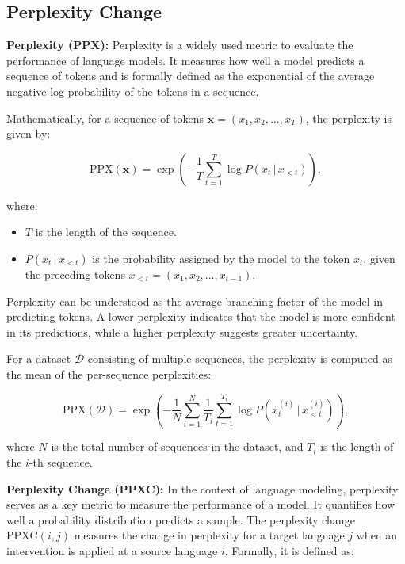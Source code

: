 \subsection{Perplexity Change}

\textbf{Perplexity (PPX):} Perplexity is a widely used metric to evaluate the performance of language models. It measures how well a model predicts a sequence of tokens and is formally defined as the exponential of the average negative log-probability of the tokens in a sequence. 

Mathematically, for a sequence of tokens $\mathbf{x} = (x_1, x_2, \dots, x_T)$, the perplexity is given by:

\begin{equation}
	\text{PPX}(\mathbf{x}) = \exp\left(-\frac{1}{T} \sum_{t=1}^T \log P(x_t \,|\, x_{<t})\right),
\end{equation}

where:
\begin{itemize}
	\item $T$ is the length of the sequence.
	\item $P(x_t \,|\, x_{<t})$ is the probability assigned by the model to the token $x_t$, given the preceding tokens $x_{<t} = (x_1, x_2, \dots, x_{t-1})$.
\end{itemize}

Perplexity can be understood as the average branching factor of the model in predicting tokens. A lower perplexity indicates that the model is more confident in its predictions, while a higher perplexity suggests greater uncertainty.

For a dataset $\mathcal{D}$ consisting of multiple sequences, the perplexity is computed as the mean of the per-sequence perplexities:

\begin{equation}
	\text{PPX}(\mathcal{D}) = \exp\left(-\frac{1}{N} \sum_{i=1}^N \frac{1}{T_i} \sum_{t=1}^{T_i} \log P(x_t^{(i)} \,|\, x_{<t}^{(i)})\right),
\end{equation}

where $N$ is the total number of sequences in the dataset, and $T_i$ is the length of the $i$-th sequence.

\textbf{Perplexity Change (PPXC):} In the context of language modeling, perplexity serves as a key metric to measure the performance of a model. It quantifies how well a probability distribution predicts a sample. The perplexity change $\text{PPXC}(i,j)$ measures the change in perplexity for a target language $j$ when an intervention is applied at a source language $i$. Formally, it is defined as:

